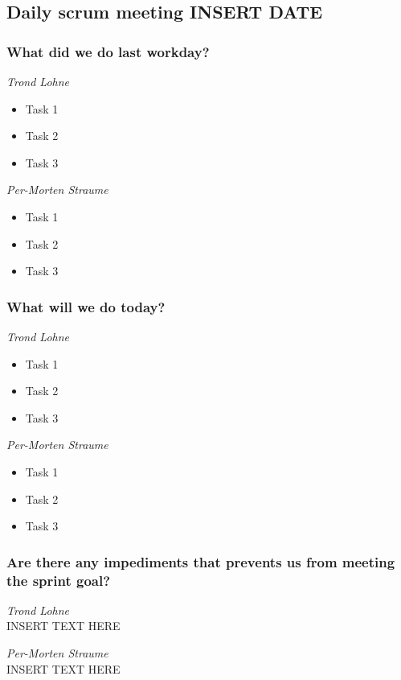 \documentclass{article}
\begin{document}
\begin{center}
\subsection*{Daily scrum meeting INSERT DATE}
\end{center}
\bigskip


\subsubsection*{What did we do last workday?}

\noindent\textit{Trond Lohne}
\begin{itemize}
	\item 
	Task 1
	
	\item 
	Task 2
	
	\item 
	Task 3
\end{itemize}

\medskip

\noindent\textit{Per-Morten Straume}
\begin{itemize}
	\item 
	Task 1
	
	\item 
	Task 2
	
	\item 
	Task 3
\end{itemize}


\subsubsection*{What will we do today?}

\noindent\textit{Trond Lohne}
\begin{itemize}
	\item 
	Task 1
	
	\item 
	Task 2
	
	\item 
	Task 3
\end{itemize}

\medskip

\noindent\textit{Per-Morten Straume}
\begin{itemize}
	\item 
	Task 1
	
	\item 
	Task 2
	
	\item 
	Task 3
\end{itemize}


\subsubsection*{Are there any impediments that prevents us from meeting the sprint goal?}

\noindent\textit{Trond Lohne}\\
INSERT TEXT HERE

\medskip

\noindent\textit{Per-Morten Straume}\\
INSERT TEXT HERE
\end{document}
